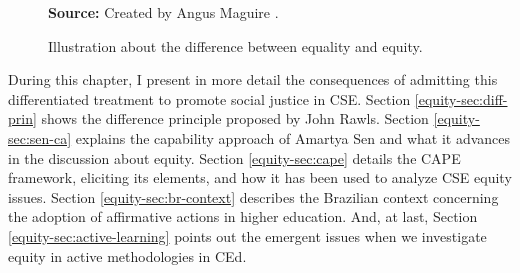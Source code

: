 \begin{figure}[ht!]
\centering

\caption{\textmd{Illustration about the difference between equality and equity.}}
\label{fig:equality-vs-equity}

\par\medskip\ABNTEXfontereduzida\selectfont\textbf{Source:} Created by Angus Maguire \cite{maguire:2016}.%
\end{figure}

During this chapter, I present in more detail the consequences of admitting this differentiated treatment to promote social justice in \gls{CSE}. Section \ref{equity-sec:diff-prin} shows the difference principle proposed by John Rawls. Section \ref{equity-sec:sen-ca} explains the capability approach of Amartya Sen and what it advances in the discussion about equity. Section \ref{equity-sec:cape} details the \gls{CAPE} framework, eliciting its elements, and how it has been used to analyze \gls{CSE} equity issues. Section \ref{equity-sec:br-context} describes the Brazilian context concerning the adoption of affirmative actions in higher education. And, at last, Section \ref{equity-sec:active-learning} points out the emergent issues when we investigate equity in active methodologies in \gls{CEd}.
